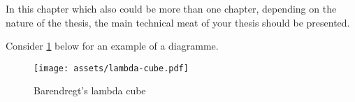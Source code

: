 In this chapter which also could be more than one chapter, depending on the
nature of the thesis, the main technical meat of your thesis should be
presented.

\bigskip
Consider \cref{fig:lambda-cube} below for an example of a diagramme.

\begin{figure}[h]
    \centering
    \texttt{[image: assets/lambda-cube.pdf]}
    \caption{Barendregt's lambda cube}
    \label{fig:lambda-cube}
\end{figure}
